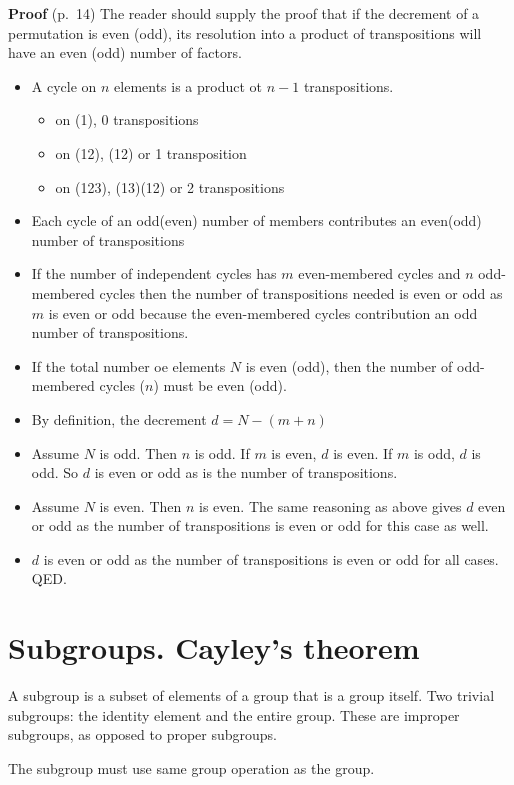 \documentclass{book}
\begin{document}
{\bf Proof} (p.\ 14) The reader should supply the proof that if the
decrement of a permutation is even (odd), its resolution into a product
of transpositions will have an even (odd) number of factors.
\begin{itemize}
\item A cycle on $n$ elements is a product ot $n-1$ transpositions.
  \begin{itemize}
  \item on (1), 0 transpositions
  \item on (12), (12) or 1 transposition
  \item on (123), (13)(12) or 2 transpositions
  \end{itemize}
\item Each cycle of an odd(even) number of members contributes an
  even(odd) number of transpositions
\item If the number of independent cycles has $m$ even-membered cycles
  and $n$ odd-membered cycles then the number of transpositions needed
  is even or odd as $m$ is even or odd because the even-membered
  cycles contribution an odd number of transpositions.
\item If the total number oe elements $N$ is even (odd), then the
  number of odd-membered cycles ($n$) must be even (odd).
\item By definition, the decrement $d = N-(m+n)$
\item Assume $N$ is odd. Then $n$ is odd. If $m$ is even, $d$ is
  even. If $m$ is odd, $d$ is odd. So $d$ is even or odd as is the
  number of transpositions.
\item Assume $N$ is even. Then $n$ is even. The same reasoning as
  above gives $d$ even or odd as the number of transpositions is even
  or odd for this case as well.
\item $d$ is even or odd as the number of transpositions is even or
  odd for all cases. QED.
\end{itemize}

\section{Subgroups. Cayley's theorem}

A subgroup is a subset of elements of a group that is a group
itself. Two trivial subgroups: the identity element and the entire
group. These are improper subgroups, as opposed to proper subgroups.

The subgroup must use same group operation as the group.
\end{document}
